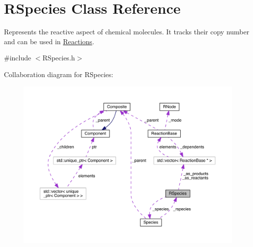\hypertarget{classRSpecies}{\section{R\+Species Class Reference}
\label{classRSpecies}
}


Represents the reactive aspect of chemical molecules. It tracks their copy number and can be used in \hyperlink{classReaction}{Reactions}.  




{\ttfamily \#include $<$R\+Species.\+h$>$}



Collaboration diagram for R\+Species\+:\nopagebreak
\begin{figure}[H]
\begin{center}
\leavevmode
\includegraphics[width=350pt]{classRSpecies__coll__graph}
\end{center}
\end{figure}

